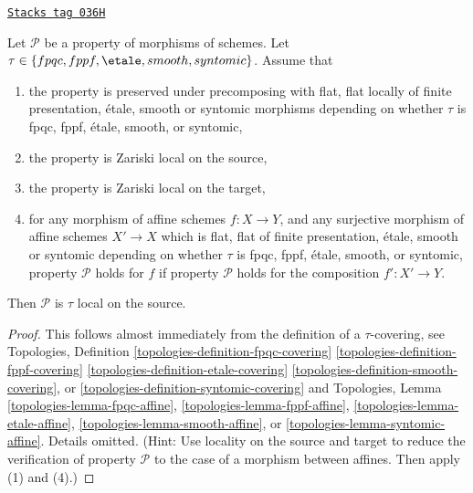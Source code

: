 \begin{lemma}
\label{descent-lemma-properties-morphisms-local-source}
\href{https://stacks.math.columbia.edu/tag/036H}{\texttt{Stacks tag 036H}}

Let $\mathcal{P}$ be a property of morphisms of schemes.
Let $\tau \in \{fpqc, \linebreak[0] fppf, \linebreak[0]
\etale, \linebreak[0] smooth, \linebreak[0] syntomic\}$.
Assume that
\begin{enumerate}
\item the property is preserved under precomposing with
flat, flat locally of finite presentation, \'etale, smooth or syntomic morphisms
depending on whether $\tau$ is fpqc, fppf, \'etale, smooth, or syntomic,
\item the property is Zariski local on the source,
\item the property is Zariski local on the target,
\item for any morphism of affine schemes $f : X \to Y$, and
any surjective morphism of affine schemes $X' \to X$
which is flat, flat of finite presentation,
\'etale, smooth or syntomic depending on whether $\tau$ is
fpqc, fppf, \'etale, smooth, or syntomic, property
$\mathcal{P}$ holds for $f$ if property $\mathcal{P}$
holds for the composition $f' : X' \to Y$.
\end{enumerate}
Then $\mathcal{P}$ is $\tau$ local on the source.
\end{lemma}

\begin{proof}
This follows almost immediately from the definition of
a $\tau$-covering, see
Topologies, Definition
\ref{topologies-definition-fpqc-covering}
\ref{topologies-definition-fppf-covering}
\ref{topologies-definition-etale-covering}
\ref{topologies-definition-smooth-covering}, or
\ref{topologies-definition-syntomic-covering}
and Topologies, Lemma
\ref{topologies-lemma-fpqc-affine},
\ref{topologies-lemma-fppf-affine},
\ref{topologies-lemma-etale-affine},
\ref{topologies-lemma-smooth-affine}, or
\ref{topologies-lemma-syntomic-affine}.
Details omitted. (Hint: Use locality on the source and target to
reduce the verification of property $\mathcal{P}$ to the case of
a morphism between affines. Then apply (1) and (4).)
\end{proof}

